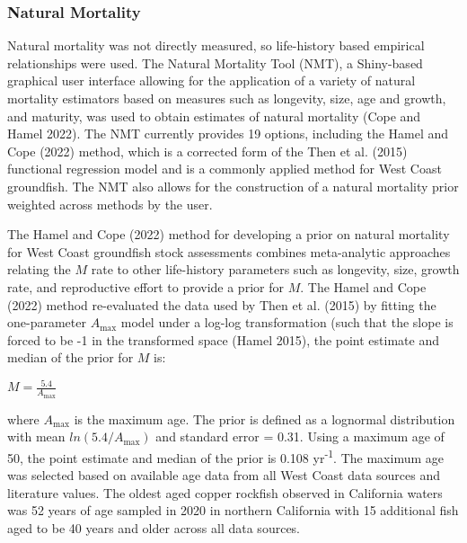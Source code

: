 \documentclass[11pt,
  english,
  letterpaper,
]{article}
\begin{document}
\hypertarget{natural-mortality}{%
\subsubsection{Natural Mortality}\label{natural-mortality}}

Natural mortality was not directly measured, so life-history based empirical relationships were used. The Natural Mortality Tool (NMT), a Shiny-based graphical user interface allowing for the application of a variety of natural mortality estimators based on measures such as longevity, size, age and growth, and maturity, was used to obtain estimates of natural mortality (Cope and Hamel 2022). The NMT currently provides 19 options, including the Hamel and Cope (2022) method, which is a corrected form of the Then et al. (2015) functional regression model and is a commonly applied method for West Coast groundfish. The NMT also allows for the construction of a natural mortality prior weighted across methods by the user.

The Hamel and Cope (2022) method for developing a prior on natural mortality for West Coast groundfish stock assessments combines meta-analytic approaches relating the \(M\) rate to other life-history parameters such as longevity, size, growth rate, and reproductive effort to provide a prior for \(M\). The Hamel and Cope (2022) method re-evaluated the data used by Then et al. (2015) by fitting the one-parameter \(A_{\text{max}}\) model under a log-log transformation (such that the slope is forced to be -1 in the transformed space (Hamel 2015), the point estimate and median of the prior for \(M\) is:

\begin{centering}

$M=\frac{5.4}{A_{\text{max}}}$

\end{centering}

\vspace{0.5cm}

where \(A_{\text{max}}\) is the maximum age. The prior is defined as a lognormal distribution with mean \(ln(5.4/A_{\text{max}})\) and standard error = 0.31. Using a maximum age of 50, the point estimate and median of the prior is 0.108 yr\textsuperscript{-1}. The maximum age was selected based on available age data from all West Coast data sources and literature values. The oldest aged copper rockfish observed in California waters was 52 years of age sampled in 2020 in northern California with 15 additional fish aged to be 40 years and older across all data sources.
\end{document}
